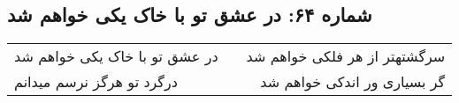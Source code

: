 \begin{center}
\section*{شماره ۶۴: در عشق تو با خاک یکی خواهم شد}
\label{sec:064}
\begin{longtable}{l p{0.5cm} r}
در عشق تو با خاک یکی خواهم شد
&&
سرگشتهتر از هر فلکی خواهم شد
\\
درگرد تو هرگز نرسم میدانم
&&
گر بسیاری ور اندکی خواهم شد
\\
\end{longtable}
\end{center}
